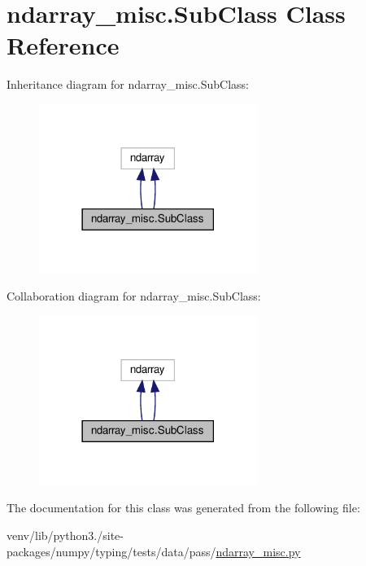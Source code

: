 \hypertarget{classndarray__misc_1_1SubClass}{}\section{ndarray\+\_\+misc.\+Sub\+Class Class Reference}
\label{classndarray__misc_1_1SubClass}


Inheritance diagram for ndarray\+\_\+misc.\+Sub\+Class\+:
\nopagebreak
\begin{figure}[H]
\begin{center}
\leavevmode
\includegraphics[width=201pt]{classndarray__misc_1_1SubClass__inherit__graph}
\end{center}
\end{figure}


Collaboration diagram for ndarray\+\_\+misc.\+Sub\+Class\+:
\nopagebreak
\begin{figure}[H]
\begin{center}
\leavevmode
\includegraphics[width=201pt]{classndarray__misc_1_1SubClass__coll__graph}
\end{center}
\end{figure}


The documentation for this class was generated from the following file\+:\begin{DoxyCompactItemize}
\item 
venv/lib/python3./site-\/packages/numpy/typing/tests/data/pass/\hyperlink{pass_2ndarray__misc_8py}{ndarray\+\_\+misc.\+py}\end{DoxyCompactItemize}
